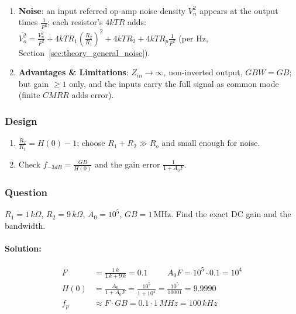 \begin{enumerate}
    the bias currents cancel, leaving only the offset current \(I_{OS} = |I_{B+} - I_{B-}|\).
  \item \textbf{Noise}: an input referred op-amp noise density \(\overline{V_n^2}\) appears at the output times
    \(\frac{1}{F^2}\); each resistor's \(4kTR\) adds: \(\overline{V_{o}^2} = \frac{\overline{V_n^2}}{F^2} + 4kTR_1\left(\frac{R_2}{R_1}\right)^2 + 4kTR_2 + 4kTR_p\frac{1}{F^2}\) (per Hz,
    Section~\ref{sec:theory_general_noise}).
  \item \textbf{Advantages \& Limitations}: \(Z_{in} \to \infty\), non-inverted output,
    \(GBW = GB\); but gain \(\geq 1\) only, and the inputs carry the full signal as
    common mode (finite \(CMRR\) adds error).
\end{enumerate}

\subsubsection{Design}
\begin{enumerate}
  \item \(\frac{R_2}{R_1} = H(0) - 1\); choose \(R_1 + R_2 \gg R_o\) and small enough for noise.
  \item Check \(f_{-3dB} = \frac{GB}{H(0)}\) and the gain error \(\frac{1}{1 + A_0 F}\).
\end{enumerate}

\subsubsection{Question}
\(R_1 = 1\,k\Omega\), \(R_2 = 9\,k\Omega\), \(A_0 = 10^5\), \(GB = 1\,\)MHz.
Find the exact DC gain and the bandwidth.
\paragraph{Solution:}
\begin{align*}
  F &= \frac{1\,k}{1\,k + 9\,k} = 0.1 \hspace{1cm} A_0 F = 10^5 \cdot 0.1 = 10^4 \\
  H(0) &= \frac{A_0}{1 + A_0 F} = \frac{10^5}{1 + 10^4} = \frac{10^5}{10001} = 9.9990 \\
  f_p &\approx F \cdot GB = 0.1 \cdot 1\,MHz = 100\,kHz
\end{align*}

